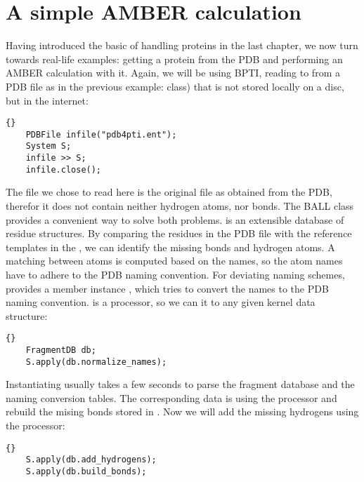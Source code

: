\section{A simple AMBER calculation}

Having introduced the basic of handling proteins in the last
chapter, we now turn towards real-life examples: getting a protein
from the PDB and performing an AMBER calculation with it.
Again, we will be using BPTI, reading to from a PDB file as in the
previous example:
class) that is not stored locally on a disc, but in the internet:

\begin{lstlisting}{}
	PDBFile	infile("pdb4pti.ent");
	System S;
	infile >> S;
	infile.close();
\end{lstlisting}

\noindent
The file we chose to read here is the original file as obtained from
the PDB, therefor it does not contain neither hydrogen atoms, nor bonds.
The BALL class  provides a convenient way to solve
both problems.  is an extensible database of residue
structures. By comparing the residues in the PDB file with the reference
templates in the , we can identify the missing bonds
and hydrogen atoms. A matching between atoms is computed based on the names,
so the atom names have to adhere to the PDB naming convention.
For deviating naming schemes,  provides a member instance
, which tries to convert the names to the PDB 
naming convention.  is a processor, so we
can  it to any given kernel data structure:

\begin{lstlisting}{}
	FragmentDB db;
	S.apply(db.normalize_names);
\end{lstlisting}

\noindent
Instantiating  usually takes a few seconds to parse the 
fragment database and the naming conversion tables. The corresponding data is
using the  processor and rebuild the mising bonds
stored in . Now we will add the missing hydrogens 
using the  processor:

\begin{lstlisting}{}
	S.apply(db.add_hydrogens);
	S.apply(db.build_bonds);
\end{lstlisting}

